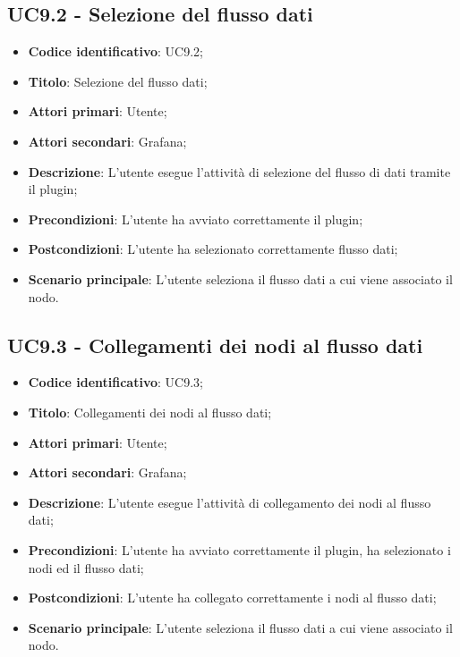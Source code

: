 \subsection{UC9.2 - Selezione del flusso dati}
\begin{itemize}
	\item \textbf{Codice identificativo}: UC9.2;
	\item \textbf{Titolo}: Selezione del flusso dati;
	\item \textbf{Attori primari}: Utente;
	\item \textbf{Attori secondari}: Grafana\glo;
	\item \textbf{Descrizione}: L'utente esegue l'attività di selezione del flusso di dati tramite il plugin;
	\item \textbf{Precondizioni}: L'utente ha avviato correttamente il plugin;
	\item \textbf{Postcondizioni}: L'utente ha selezionato correttamente flusso dati;
	\item \textbf{Scenario principale}: L'utente seleziona il flusso dati a cui viene associato il nodo.
\end{itemize}

\subsection{UC9.3 - Collegamenti dei nodi al flusso dati}
\begin{itemize}
	\item \textbf{Codice identificativo}: UC9.3;
	\item \textbf{Titolo}: Collegamenti dei nodi al flusso dati;
	\item \textbf{Attori primari}: Utente;
	\item \textbf{Attori secondari}: Grafana\glo;
	\item \textbf{Descrizione}: L'utente esegue l'attività di collegamento dei nodi al flusso dati;
	\item \textbf{Precondizioni}: L'utente ha avviato correttamente il plugin, ha selezionato i nodi ed il flusso dati;
	\item \textbf{Postcondizioni}: L'utente ha collegato correttamente i nodi al flusso dati;
	\item \textbf{Scenario principale}: L'utente seleziona il flusso dati a cui viene associato il nodo.
\end{itemize}

